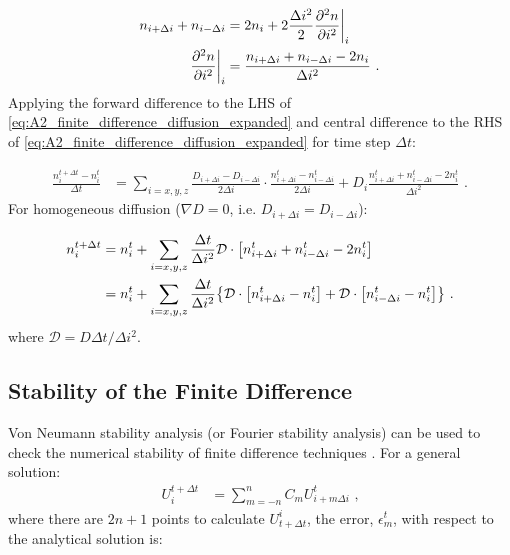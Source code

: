 \begin{equation}
    \begin{aligned}
        n_{i+\Delta i}+n_{i-\Delta i} &=2n_{i} + 2\frac{\Delta i^2}{2}\pdv[2]{n}{i}\bigg|_{i} \\
        \pdv[2]{n}{i} \bigg|_{i}&=\frac{n_{i+\Delta i}+n_{i-\Delta i}-2n_i}{\Delta i^2}\text{ .} 
    \end{aligned}
\end{equation}
\noindent Applying the forward difference to the LHS of \autoref{eq:A2_finite_difference_diffusion_expanded} and central difference to the RHS of \autoref{eq:A2_finite_difference_diffusion_expanded} for time step $\Delta t$:

\begin{equation}
    \begin{aligned}
    \frac{n_i^{t+\Delta t}-n_i^t}{\Delta t}&=\sum_{i=x,y,z}\frac{D_{i+\Delta i}-D_{i-\Delta i}}{2\Delta i}\cdot \frac{n_{i+\Delta i}^t-n_{i-\Delta i}^t}{2\Delta i}+D_i\frac{n_{i+\Delta i}^t+n_{i-\Delta i}^t-2n_i^t}{\Delta i^2}\text{ .} 
    \end{aligned}
\end{equation}
\noindent For homogeneous diffusion ($\nabla D=0$, i.e. $D_{i+\Delta i}=D_{i-\Delta i}$):

\begin{equation}
    \begin{aligned}
    n_i^{t+\Delta t}&=n_i^t+\sum_{i=x,y,z}\frac{\Delta t}{\Delta i^2}\mathcal{D}\cdot\qty[n_{i+\Delta i}^t+n_{i-\Delta i}^t-2n_i^t] \\
    &=n_i^t+\sum_{i=x,y,z} \frac{\Delta t}{\Delta i^2}\qty{\mathcal{D}\cdot\qty[n_{i+\Delta i}^t-n_i^t]+\mathcal{D}\cdot\qty[n_{i-\Delta i}^t-n_i^t]}\text{ .} 
    \end{aligned} \label{eq:A2_diffusion_finite_diff}
\end{equation}
\noindent where $\mathcal{D}= D\Delta t/\Delta i^2$. %

\subsection{Stability of the Finite Difference} \label{sec:A2_finite_stability}

Von Neumann stability analysis (or Fourier stability analysis) can be used to check the numerical stability of finite difference techniques \citep{alma9929637001811}. For a general solution:
\begin{equation}
    \begin{aligned}
        U^{t+\Delta t}_i&=\sum_{m=-n}^n C_m U^t_{i+m\Delta i}\text{ ,} 
    \end{aligned} \label{eq:A3_von_newmann_example}
\end{equation}
\noindent where there are $2n+1$ points to calculate $U_{t+\Delta t}^i$, the error, $\epsilon_m^t$, with respect to the analytical solution is:

